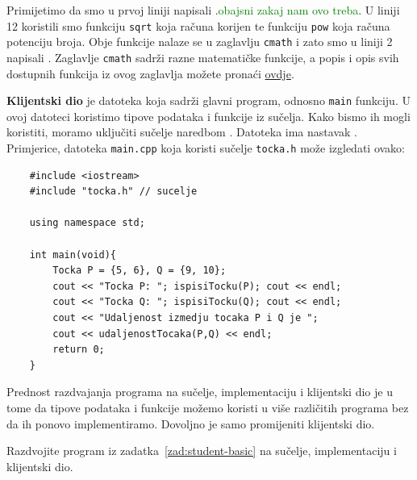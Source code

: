 Primijetimo da smo u prvoj liniji napisali .\textcolor{green}{obajsni zakaj nam ovo treba}.
U liniji 12 koristili smo funkciju \texttt{sqrt} koja računa korijen te funkciju \texttt{pow} koja računa potenciju broja. Obje funkcije nalaze se u zaglavlju \texttt{cmath} i zato smo u liniji 2 napisali . Zaglavlje \texttt{cmath} sadrži razne matematičke funkcije, a popis i opis svih dostupnih funkcija iz ovog zaglavlja možete pronaći \href{https://cplusplus.com/reference/cmath/}{ovdje}.
\medskip

\textbf{Klijentski dio} je datoteka koja sadrži glavni program, odnosno \texttt{main} funkciju. 
U ovoj datoteci koristimo tipove podataka i funkcije iz sučelja. Kako bismo ih mogli koristiti, moramo uključiti sučelje naredbom . Datoteka ima nastavak .
Primjerice, datoteka \texttt{main.cpp} koja koristi sučelje \texttt{tocka.h} može izgledati ovako:
\begin{verbatim}
    #include <iostream>
    #include "tocka.h" // sucelje
    
    using namespace std;

    int main(void){
        Tocka P = {5, 6}, Q = {9, 10};
        cout << "Tocka P: "; ispisiTocku(P); cout << endl;
        cout << "Tocka Q: "; ispisiTocku(Q); cout << endl;
        cout << "Udaljenost izmedju tocaka P i Q je ";
        cout << udaljenostTocaka(P,Q) << endl;
        return 0;
    }
\end{verbatim}

Prednost razdvajanja programa na sučelje, implementaciju i klijentski dio je u tome da tipove podataka i funkcije možemo koristi u više različitih programa bez da ih ponovo implementiramo. Dovoljno je samo promijeniti klijentski dio.
\medskip

\begin{zadatak}\label{zad:student-razdvojeno}
    Razdvojite program iz zadatka~\ref{zad:student-basic} na sučelje, implementaciju i klijentski dio.
\end{zadatak}

